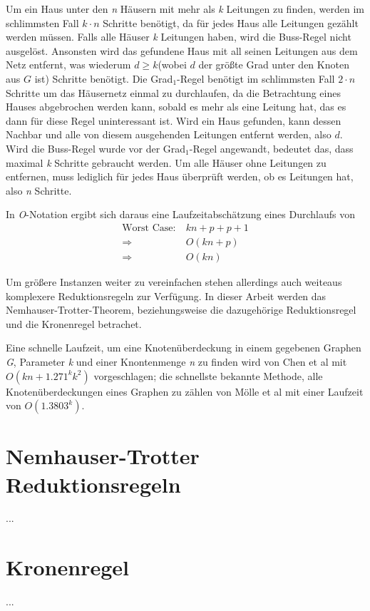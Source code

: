 Um ein Haus unter den \emph{n} Häusern mit mehr als \emph{k} Leitungen zu finden, werden im schlimmsten Fall $k \cdot n$ Schritte benötigt, da für jedes Haus alle Leitungen gezählt werden müssen. Falls alle Häuser \emph{k} Leitungen haben, wird die Buss-Regel nicht ausgelöst. Ansonsten wird das gefundene Haus mit all seinen Leitungen aus dem Netz entfernt, was wiederum $d \geq k$(wobei $d$ der größte Grad unter den Knoten aus $G$ ist) Schritte benötigt. Die Grad$_{1}$-Regel benötigt im schlimmsten Fall $2 \cdot n$ Schritte um das Häusernetz einmal zu durchlaufen, da die Betrachtung eines Hauses abgebrochen werden kann, sobald es mehr als eine Leitung hat, das es dann für diese Regel uninteressant ist. Wird ein Haus gefunden, kann dessen Nachbar und alle von diesem ausgehenden Leitungen entfernt werden, also $d$. Wird die Buss-Regel wurde vor der Grad$_{1}$-Regel angewandt, bedeutet das, dass maximal \emph{k} Schritte gebraucht werden. Um alle Häuser ohne Leitungen zu entfernen, muss lediglich für jedes Haus überprüft werden, ob es Leitungen hat, also \emph{n} Schritte.




In \emph{O}-Notation ergibt sich daraus eine Laufzeitabschätzung eines Durchlaufs von
\begin{align}
\text{Worst Case}:\ & kn + p + p + 1\\
\Rightarrow\ & O(kn + p)\\
\Rightarrow\ & O(kn)
\end{align}

Um größere Instanzen weiter zu vereinfachen stehen allerdings auch weiteaus komplexere Reduktionsregeln zur Verfügung. In dieser Arbeit werden das Nemhauser-Trotter-Theorem, beziehungsweise die dazugehörige Reduktionsregel und die Kronenregel betrachet.


Eine schnelle Laufzeit, um eine Knotenüberdeckung in einem gegebenen Graphen \emph{G}, Parameter \emph{k} und einer Knontenmenge \emph{n} zu finden wird von Chen et al \cite{paper:4} mit $O(kn + 1.271^{k}k^{2})$ vorgeschlagen; die schnellste bekannte Methode, alle Knotenüberdeckungen eines Graphen zu zählen von Mölle et al \cite{paper:5} mit einer Laufzeit von $O(1.3803^{k})$.


\section{Nemhauser-Trotter Reduktionsregeln}
\label{ch:Grundlagen:sec:Nemhauser-Trotter Reduktionsregeln}

...

\section{Kronenregel}
\label{ch:Grundlagen:sec:Kronenregel}

...





